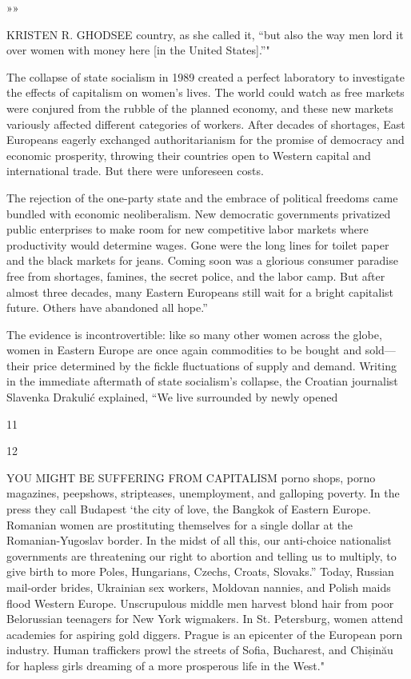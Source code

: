  \par 
»»
 \par 
KRISTEN R. GHODSEE country, as she called it, “but also the way men lord it over women with money here [in the United States].”"
 \par 
The collapse of state socialism in 1989 created a perfect laboratory to investigate the effects of capitalism on women’s lives. The world could watch as free markets were conjured from the rubble of the planned economy, and these new markets variously affected different categories of workers. After decades of shortages, East Europeans eagerly exchanged authoritarianism for the promise of democracy and economic prosperity, throwing their countries open to Western capital and international trade. But there were unforeseen costs.
 \par 
The rejection of the one-party state and the embrace of political freedoms came bundled with economic neoliberalism. New democratic governments privatized public enterprises to make room for new competitive labor markets where productivity would determine wages. Gone were the long lines for toilet paper and the black markets for jeans. Coming soon was a glorious consumer paradise free from shortages, famines, the secret police, and the labor camp. But after almost three decades, many Eastern Europeans still wait for a bright capitalist future. Others have abandoned all hope.”
 \par 
The evidence is incontrovertible: like so many other women across the globe, women in Eastern Europe are once again commodities to be bought and sold—their price determined by the fickle fluctuations of supply and demand. Writing in the immediate aftermath of state socialism’s collapse, the Croatian journalist Slavenka Drakulić explained, “We live surrounded by newly opened
 \par 
11
 \par 
12
 \par 
YOU MIGHT BE SUFFERING FROM CAPITALISM porno shops, porno magazines, peepshows, stripteases, unemployment, and galloping poverty. In the press they call Budapest ‘the city of love, the Bangkok of Eastern Europe. Romanian women are prostituting themselves for a single dollar at the Romanian-Yugoslav border. In the midst of all this, our anti-choice nationalist governments are threatening our right to abortion and telling us to multiply, to give birth to more Poles, Hungarians, Czechs, Croats, Slovaks.” Today, Russian mail-order brides, Ukrainian sex workers, Moldovan nannies, and Polish maids flood Western Europe. Unscrupulous middle men harvest blond hair from poor Belorussian teenagers for New York wigmakers. In St. Petersburg, women attend academies for aspiring gold diggers. Prague is an epicenter of the European porn industry. Human traffickers prowl the streets of Sofia, Bucharest, and Chișinău for hapless girls dreaming of a more prosperous life in the West."
